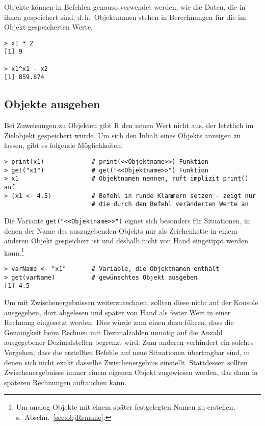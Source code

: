 Objekte können in Befehlen genauso verwendet werden, wie die Daten, die in ihnen gespeichert sind, d.\,h.\ Objektnamen stehen in Berechnungen für die im Objekt gespeicherten Werte.
\begin{lstlisting}
> x1 * 2
[1] 9

> x1^x1 - x2
[1] 859.874
\end{lstlisting}

\subsection{Objekte ausgeben}
\label{sec:printObject}

Bei Zuweisungen zu Objekten gibt R den neuen Wert nicht aus, der letztlich im Zielobjekt gespeichert wurde. Um sich den Inhalt eines Objekts anzeigen zu lassen, gibt es folgende Möglichkeiten:
\begin{lstlisting}
> print(x1)             # print(<<Objektname>>) Funktion
> get("x1")             # get("<<Objektname>>") Funktion
> x1                    # Objektnamen nennen, ruft implizit print() auf
> (x1 <- 4.5)           # Befehl in runde Klammern setzen - zeigt nur
                        # die durch den Befehl veränderten Werte an
\end{lstlisting}

Die Variante \lstinline!get("<<Objektname>>")! eignet sich besonders für Situationen, in denen der Name des auszugebenden Objekts nur als Zeichenkette in einem anderen Objekt gespeichert ist und deshalb nicht von Hand eingetippt werden kann.\footnote{Um analog Objekte mit einem später festgelegten Namen zu erstellen, s.\ Abschn.\ \ref{sec:objRename}.}
\begin{lstlisting}
> varName <- "x1"       # Variable, die Objektnamen enthält
> get(varName)          # gewünschtes Objekt ausgeben
[1] 4.5
\end{lstlisting}

Um mit Zwischenergebnissen weiterzurechnen, sollten diese nicht auf der Konsole ausgegeben, dort abgelesen und später von Hand als fester Wert in einer Rechnung eingesetzt werden. Dies würde zum einen dazu führen, dass die Genauigkeit beim Rechnen mit Dezimalzahlen unnötig auf die Anzahl ausgegebener Dezimalstellen begrenzt wird. Zum anderen verhindert ein solches Vorgehen, dass die erstellten Befehle auf neue Situationen übertragbar sind, in denen sich nicht exakt dasselbe Zwischenergebnis einstellt. Stattdessen sollten Zwischenergebnisse immer einem eigenen Objekt zugewiesen werden, das dann in späteren Rechnungen auftauchen kann.


